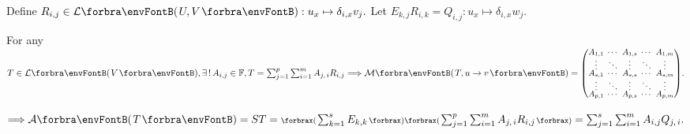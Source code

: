 Define $R_{i,j}\in\Lm{U,V}:u_x\mapsto\delta_{i,x}v_j.$ \;Let $E_{k,j}R_{i,k}=Q_{i,j}:u_x\mapsto\delta_{i,x}w_j.$\par\vspace{-20pt}\quad
For any $T\in\Lm{V},\exists\,!\,A_{i,j}\in{}\Fbb,T=\textstyle\sum_{j=1}^p\sum_{i=1}^m A_{j,\,i}R_{i,j}\Longrightarrow\Mt{T,u\rightarrow v}={\small\begin{pmatrix}
		A_{1,1} &\hspace{-6pt} \cdots &\hspace{-6pt} A_{1,s} &\hspace{-6pt} \cdots &\hspace{-6pt} A_{1,m}\\[-2pt]
		\vdots  &\hspace{-6pt} \ddots &\hspace{-6pt} \vdots  &\hspace{-6pt} \ddots &\hspace{-6pt} \vdots\\[-4pt]
		A_{s,1} &\hspace{-6pt} \cdots &\hspace{-6pt} A_{s,s} &\hspace{-6pt} \cdots &\hspace{-6pt} A_{s,m}\\[-2pt]
		\vdots  &\hspace{-6pt} \ddots &\hspace{-6pt} \vdots  &\hspace{-6pt} \ddots &\hspace{-6pt} \vdots\\[-4pt]
		A_{p,1} &\hspace{-6pt} \cdots &\hspace{-6pt} A_{p,s} &\hspace{-6pt} \cdots &\hspace{-6pt} A_{p,m}
\end{pmatrix}}.$\par\vspace{-20pt}\quad
$\Longrightarrow\mA\Par{T}=ST=\textstyle\XPar{{\sum_{k=1}^sE_{k,k}}}\XPar{{\textstyle\sum_{j=1}^p\sum_{i=1}^m A_{j,\,i}R_{i,j}}}=\textstyle\sum_{j=1}^s\sum_{i=1}^m A_{i,j}Q_{j,\,i}.$\par\hspace{0pt}
